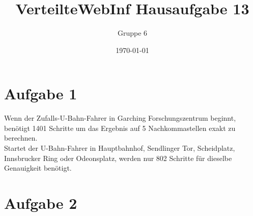 \documentclass[a4paper]{scrartcl}
\author{Gruppe 6}
\title{\textbf{VerteilteWebInf Hausaufgabe 13}}
\date{\today}
\begin{document}
\maketitle

\section*{Aufgabe 1}
Wenn der Zufalls-U-Bahn-Fahrer in Garching Forschungszentrum beginnt, benötigt 1401 Schritte um das Ergebnis auf 5 Nachkommastellen exakt zu berechnen.\\
Startet der U-Bahn-Fahrer in Hauptbahnhof, Sendlinger Tor, Scheidplatz, Innsbrucker Ring oder Odeonsplatz, werden nur 802 Schritte für dieselbe Genauigkeit benötigt.

\section*{Aufgabe 2}
\end{document}
